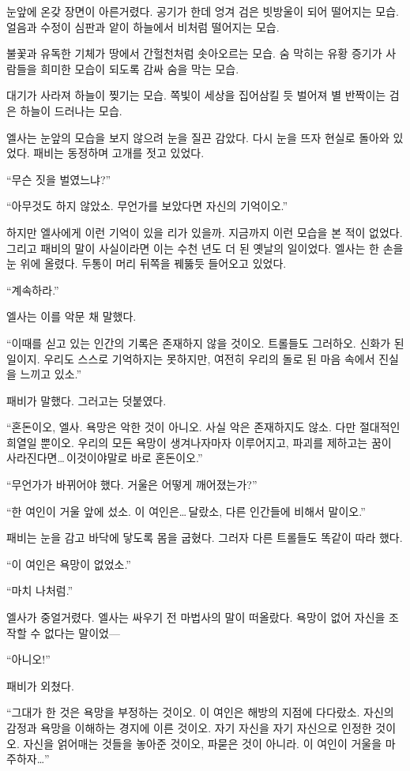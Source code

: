 눈앞에 온갖 장면이 아른거렸다. 공기가 한데 엉겨 검은 빗방울이 되어 떨어지는 모습. 얼음과 수정이 심판과 앝이 하늘에서 비처럼 떨어지는 모습.

불꽃과 유독한 기체가 땅에서 간헐천처럼 솟아오르는 모습. 숨 막히는 유황 증기가 사람들을 희미한 모습이 되도록 감싸 숨을 막는 모습.

대기가 사라져 하늘이 찢기는 모습. 쪽빛이 세상을 집어삼킬 듯 벌어져 별 반짝이는 검은 하늘이 드러나는 모습.

엘사는 눈앞의 모습을 보지 않으려 눈을 질끈 감았다. 다시 눈을 뜨자 현실로 돌아와 있었다. 패비는 동정하며 고개를 젓고 있었다.

``무슨 짓을 벌였느냐?''

``아무것도 하지 않았소. 무언가를 보았다면 자신의 기억이오.''

하지만 엘사에게 이런 기억이 있을 리가 있을까. 지금까지 이런 모습을 본 적이 없었다. 그리고 패비의 말이 사실이라면 이는 수천 년도 더 된 옛날의 일이었다. 엘사는 한 손을 눈 위에 올렸다. 두통이 머리 뒤쪽을 꿰뚫듯 들어오고 있었다.

``계속하라.''

엘사는 이를 악문 채 말했다.

``이때를 싣고 있는 인간의 기록은 존재하지 않을 것이오. 트롤들도 그러하오. 신화가 된 일이지. 우리도 스스로 기억하지는 못하지만, 여전히 우리의 돌로 된 마음 속에서 진실을 느끼고 있소.''

패비가 말했다. 그러고는 덧붙였다.

``혼돈이오, 엘사. 욕망은 악한 것이 아니오. 사실 악은 존재하지도 않소. 다만 절대적인 희열일 뿐이오. 우리의 모든 욕망이 생겨나자마자 이루어지고, 파괴를 제하고는 꿈이 사라진다면\ldots\,이것이야말로 바로 혼돈이오.''

``무언가가 바뀌어야 했다. 거울은 어떻게 깨어졌는가?''

``한 여인이 거울 앞에 섰소. 이 여인은\ldots\,달랐소, 다른 인간들에 비해서 말이오.''

패비는 눈을 감고 바닥에 닿도록 몸을 굽혔다. 그러자 다른 트롤들도 똑같이 따라 했다.

``이 여인은 욕망이 없었소.''

``마치 나처럼.''

엘사가 중얼거렸다. 엘사는 싸우기 전 마법사의 말이 떠올랐다. 욕망이 없어 자신을 조작할 수 없다는 말이었—

``아니오!''

패비가 외쳤다.

``그대가 한 것은 욕망을 부정하는 것이오. 이 여인은 해방의 지점에 다다랐소. 자신의 감정과 욕망을 이해하는 경지에 이른 것이오. 자기 자신을 자기 자신으로 인정한 것이오. 자신을 얽어매는 것들을 놓아준 것이오, 파묻은 것이 아니라. 이 여인이 거울을 마주하자\ldots''

